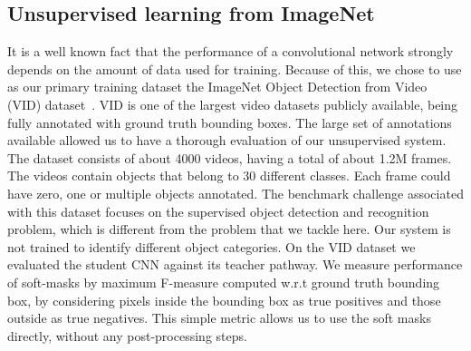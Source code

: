 \documentclass[10pt,twocolumn,letterpaper]{article}
\begin{document}
\subsection{Unsupervised learning from ImageNet}
\label{sec:VID}
It is a well known fact that the performance of a convolutional network strongly depends on the amount of data used for training. Because of this, we chose to use as our
primary training dataset the ImageNet Object Detection from Video (VID) dataset~\cite{russakovsky2015imagenet}. VID is one of the largest video datasets publicly available, being fully annotated with ground truth bounding boxes. The large set of annotations available allowed us to have a thorough evaluation of our unsupervised system. The dataset consists of about 4000 videos, having a total of
about 1.2M frames. The videos contain objects that
belong to 30 different classes. Each frame could have zero, one or multiple objects annotated. 
The benchmark challenge associated with this dataset
focuses on the supervised object detection and recognition problem,
which is different from the problem that we tackle here. Our system is not trained 
to identify different object categories. On the VID dataset we evaluated the student CNN against
its teacher pathway. We measure performance of soft-masks by maximum F-measure computed w.r.t ground truth bounding box, by considering pixels inside the bounding box as true positives and those outside as true negatives. This simple metric allows us to use the soft masks directly, without any post-processing steps.
\end{document}
